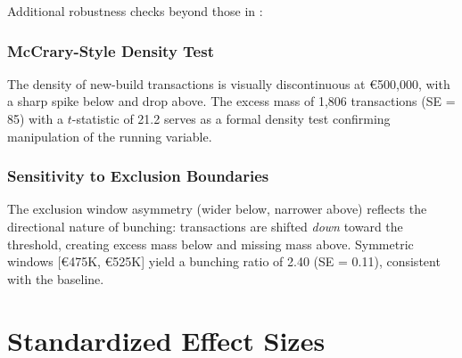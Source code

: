 \documentclass[12pt]{article}
\newcommand{\eur}[1]{\euro{}#1}
\begin{document}
Additional robustness checks beyond those in :

\subsubsection*{McCrary-Style Density Test} The density of new-build transactions is visually discontinuous at \eur{500,000}, with a sharp spike below and drop above. The excess mass of 1,806 transactions (SE = 85) with a $t$-statistic of 21.2 serves as a formal density test confirming manipulation of the running variable.

\subsubsection*{Sensitivity to Exclusion Boundaries} The exclusion window asymmetry (wider below, narrower above) reflects the directional nature of bunching: transactions are shifted \textit{down} toward the threshold, creating excess mass below and missing mass above. Symmetric windows [\eur{475K}, \eur{525K}] yield a bunching ratio of 2.40 (SE = 0.11), consistent with the baseline.

\section{Standardized Effect Sizes}
\label{sec:sde}


\end{document}
